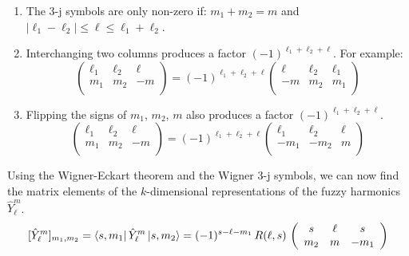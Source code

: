 \begin{enumerate}
%
\item The 3-j symbols are only non-zero if: $m_1 + m_2 = m$ and $|\ell_1 - \ell_2| \leq \ell \leq \ell_1 + \ell_2$.
%
\item Interchanging two columns produces a factor $(-1)^{\ell_1 + \ell_2 + \ell}$. For example:
%
%
\begin{equation}\label{3j column interchange}
\left( \begin{array}{ccc}
\ell_1 & \ell_2 & \ell \\
m_1 & m_2 & -m \\
\end{array} \right)
=
(-1)^{\ell_1 + \ell_2 + \ell} \left( \begin{array}{ccc}
\ell & \ell_2 & \ell_1 \\
-m & m_2 & m_1 \\
\end{array} \right)
\end{equation}
%
%
\item Flipping the signs of $m_1$, $m_2$, $m$ also produces a factor $(-1)^{\ell_1 + \ell_2 + \ell}$.
%
%
\begin{equation}\label{3j m sign flip}
\left( \begin{array}{ccc}
\ell_1 & \ell_2 & \ell \\
m_1 & m_2 & -m \\
\end{array} \right)
=
(-1)^{\ell_1 + \ell_2 + \ell} \left( \begin{array}{ccc}
\ell_1 & \ell_2 & \ell \\
-m_1 & -m_2 & m \\
\end{array} \right)
\end{equation}
%
%
\end{enumerate}
%
%
Using the Wigner-Eckart theorem and the Wigner 3-j symbols, we can now find the matrix elements of the $k$-dimensional representations of the fuzzy harmonics $\hat{Y}^m_\ell$.
%
%
\begin{equation}\label{fuzzy harmonics matrix elements}
[\hat{Y}^m_\ell]_{m_1,m_2}
=
\bra{s, m_1} \hat{Y}^m_\ell \ket{s, m_2}
=
(-1)^{s-\ell-m_1} \, R(\ell,s) \,
\left( \begin{array}{ccc}
s & \ell & s \\
m_2 & m & -m_1 \\
\end{array} \right)
\end{equation}
